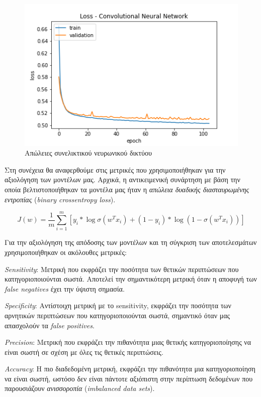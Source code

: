 \begin{figure}[H]
  \centering
  \includegraphics[width=1\textwidth]{images/CNNloss.png}
  \caption{Απώλειες συνελικτικού νευρωνικού δικτύου}
  \label{fig:CNNloss}
\end{figure}

Στη συνέχεια θα αναφερθούμε στις μετρικές που χρησιμοποιήθηκαν για την αξιολόγηση των μοντέλων μας. Αρχικά, η αντικειμενική συνάρτηση με βάση την οποία βελτιστοποιήθηκαν τα μοντέλα μας ήταν η \textit{απώλεια δυαδικής διασταυρωμένης εντροπίας} (\textit{binary crossentropy loss}).

{\noindent \Large
\begin{equation}
   J(w)= \frac{1}{m} \sum_{i=1}^{m}[ y_{i}*\log{\sigma(w^{\textit{T}}x_{i})} + (1-y_i)*\log{(1-\sigma(w^{\textit{T}}x_{i}))} ]
\end{equation}}

Για την αξιολόγηση της απόδοσης των μοντέλων και τη σύγκριση των αποτελεσμάτων χρησιμοποιήθηκαν οι ακόλουθες μετρικές:

\textit{Sensitivity}: Μετρική που εκφράζει την ποσότητα των θετικών περιπτώσεων που κατηγοριοποιούνται σωστά. Αποτελεί την σημαντικότερη μετρική όταν η αποφυγή των \textit{false negatives} έχει την ύψιστη σημασία.

\textit{Specificity}: Αντίστοιχη μετρική με το sensitivity, εκφράζει την ποσότητα των αρνητικών περιπτώσεων που κατηγοριοποιούνται σωστά, σημαντικό όταν μας απασχολούν τα \textit{false positives}.

\textit{Precision}: Μετρική που εκφράζει την πιθανότητα μιας θετικής κατηγοριοποίησης να είναι σωστή σε σχέση με όλες τις θετικές περιπτώσεις.

\textit{Accuracy}: Η πιο διαδεδομένη μετρική, εκφράζει την πιθανότητα μια κατηγοριοποίηση να είναι σωστή, ωστόσο δεν είναι πάντοτε αξιόπιστη στην περίπτωση δεδομένων που παρουσιάζουν \textit{ανισσοροπία} (\textit{imbalanced data sets}).


